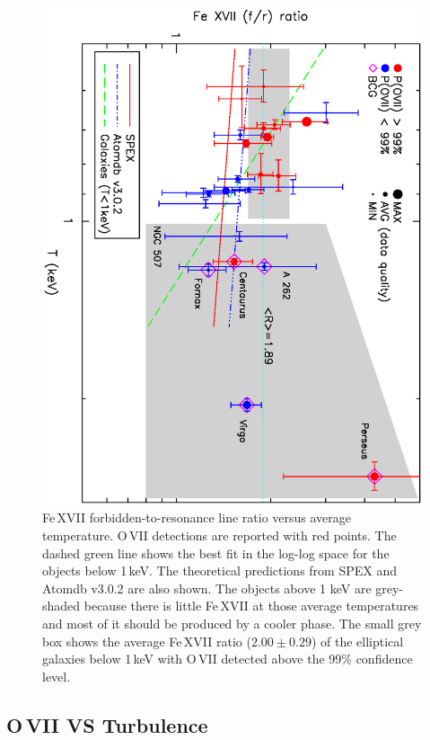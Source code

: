 \documentclass[useAMS,usenatbib]{mn2e}
\begin{document}
\begin{figure}
  \includegraphics[width=1.5\columnwidth, angle=90, bb=65 80 530 680]{paper_ovii_fig02.ps}
   \caption{Fe\,{\small XVII} forbidden-to-resonance line ratio versus
   average temperature. O\,{\small VII} detections are reported with red points.
   The dashed green line shows the best fit in the log-log space for the objects below 1\,keV.
   The theoretical predictions from SPEX and Atomdb v3.0.2 are also shown.
   The objects above 1 keV are grey-shaded because there is little Fe\,{\small XVII} at those
   average temperatures and most of it should be produced by a cooler phase.
   The small grey box shows the average Fe\,{\small XVII} ratio ($2.00\pm0.29$)
   of the elliptical galaxies below 1\,keV with O\,{\small VII} detected above 
   the 99\% confidence level.} 
   \label{Fig:Resonant_scattering}
\vspace{-0.4cm}
\end{figure}

\subsection{O\,{\small VII} VS Turbulence}
\label{sec:gas_turbulence}
\end{document}
